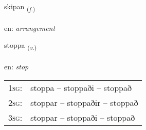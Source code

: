 \documentclass[frontgrid, backgrid]{flacards}\usepackage[]{graphicx}\usepackage[]{xcolor}
\begin{document}
\renewcommand{\flhead}{\vskip5pt \fboxsep=0pt {\small\bfseries\footnotesize Nafnorð | Noun}}
\renewcommand{\fcfoot}{\vskip5pt \fboxsep=0pt \hspace{2pt}{\small\bfseries\footnotesize 3K}}

\renewcommand{\blhead}{\vskip5pt {\small\bfseries\footnotesize Nafnorð | Noun }}
\renewcommand{\bcfoot}{\vskip5pt \hspace{2pt}{\small\bfseries\footnotesize 3K}}


{skipan \small{\textsubscript{(\textit{f.})}} \\[1ex] %
\textphonetic{[scɪːpan]} \\
en: \emph{arrangement} \\  [2ex]
\renewcommand*{\arraystretch}{0.8}
}

\renewcommand{\flhead}{\vskip5pt \fboxsep=0pt {\small\bfseries\footnotesize Sagnorð | Verb}}
\renewcommand{\fcfoot}{\vskip5pt \fboxsep=0pt \hspace{2pt}{\small\bfseries\footnotesize 3K}}

\renewcommand{\blhead}{\vskip5pt {\small\bfseries\footnotesize Sagnorð | Verb }}
\renewcommand{\bcfoot}{\vskip5pt \hspace{2pt}{\small\bfseries\footnotesize 3K}}


{stoppa \small{\textsubscript{(\textit{v.})}} \\[1ex] %
\textphonetic{[stɔhpa]} \\
en: \emph{stop} \\  [2ex]
\renewcommand*{\arraystretch}{0.8}
\begin{tabular}{p{1cm}l}
\textsc{1sg}: & stoppa -- stoppaði -- stoppað \\ 
\textsc{2sg}: & stoppar -- stoppaðir -- stoppað \\ 
\textsc{3sg}: & stoppar -- stoppaði -- stoppað \\ 
\end{tabular}
}
\end{document}
